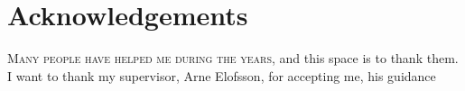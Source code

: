 \chapter*{Acknowledgements}

\lettrine[lines=3, lhang=0.25, nindent=0em]{\color{Maroon}M}{any people have helped me during the years,}
and this space is to thank them.
I want to thank my supervisor, Arne Elofsson, for accepting me, his guidance 